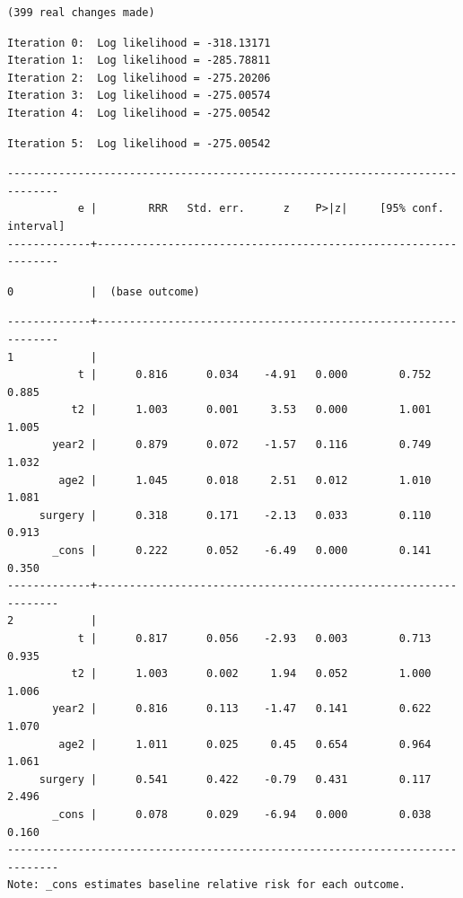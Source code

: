 \documentclass[
  12pt,
  letterpaper,
  DIV=11,
  numbers=noendperiod,
  onepage,
  openany]{scrreprt}
\begin{document}
\begin{verbatim}
(399 real changes made)
\end{verbatim}

\begin{verbatim}
Iteration 0:  Log likelihood = -318.13171  
Iteration 1:  Log likelihood = -285.78811  
Iteration 2:  Log likelihood = -275.20206  
Iteration 3:  Log likelihood = -275.00574  
Iteration 4:  Log likelihood = -275.00542  
\end{verbatim}

\begin{verbatim}
Iteration 5:  Log likelihood = -275.00542  
\end{verbatim}

\begin{verbatim}
------------------------------------------------------------------------------
           e |        RRR   Std. err.      z    P>|z|     [95% conf. interval]
-------------+----------------------------------------------------------------
\end{verbatim}

\begin{verbatim}
0            |  (base outcome)
\end{verbatim}

\begin{verbatim}
-------------+----------------------------------------------------------------
1            |
           t |      0.816      0.034    -4.91   0.000        0.752       0.885
          t2 |      1.003      0.001     3.53   0.000        1.001       1.005
       year2 |      0.879      0.072    -1.57   0.116        0.749       1.032
        age2 |      1.045      0.018     2.51   0.012        1.010       1.081
     surgery |      0.318      0.171    -2.13   0.033        0.110       0.913
       _cons |      0.222      0.052    -6.49   0.000        0.141       0.350
-------------+----------------------------------------------------------------
2            |
           t |      0.817      0.056    -2.93   0.003        0.713       0.935
          t2 |      1.003      0.002     1.94   0.052        1.000       1.006
       year2 |      0.816      0.113    -1.47   0.141        0.622       1.070
        age2 |      1.011      0.025     0.45   0.654        0.964       1.061
     surgery |      0.541      0.422    -0.79   0.431        0.117       2.496
       _cons |      0.078      0.029    -6.94   0.000        0.038       0.160
------------------------------------------------------------------------------
Note: _cons estimates baseline relative risk for each outcome.
\end{verbatim}
\end{document}
